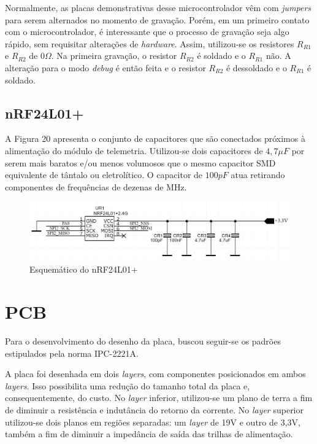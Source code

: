 \documentclass[11pt]{abntex2}
\begin{document}
					Normalmente, as placas demonstrativas desse microcontrolador
					vêm com \textit{jumpers} para serem alternados no momento de
					gravação. Porém, em um primeiro contato com o
					microcontrolador, é interessante que o processo de gravação
					seja algo rápido, sem requisitar alterações de
					\textit{hardware}. Assim, utilizou-se os resistores $R_{R1}$
					e $R_{R2}$ de $0\Omega$. Na primeira gravação, o resistor
					$R_{R2}$ é soldado e o $R_{R1}$ não. A alteração para o modo
					\textit{debug} é então feita e o resistor $R_{R2}$ é
					dessoldado e o $R_{R1}$ é soldado.

				\subsection{nRF24L01+}
					A Figura 20 apresenta o conjunto de capacitores que são
					conectados próximos à alimentação do módulo de telemetria.
					Utilizou-se dois capacitores de $4,7\mu F$ por serem mais
					baratos e/ou menos volumosos que o mesmo capacitor SMD
					equivalente de tântalo ou eletrolítico. O capacitor de
					$100pF$ atua retirando componentes de frequências de dezenas
					de MHz.

					\begin{figure}[!ht]
						\centering
						\includegraphics[width=\linewidth]{../Fotos/nrfEsquematico.jpg}
						\caption{Esquemático do nRF24L01+}
					\end{figure}
			\section{PCB}
				Para o desenvolvimento do desenho da placa, buscou seguir-se
				os padrões estipulados pela norma IPC-2221A.\cite{ipc}

				A placa foi desenhada em dois \textit{layers}, com componentes
				posicionados em ambos \textit{layers}. Isso possibilita uma redução
				do tamanho total da placa e, consequentemente, do custo. No
				\textit{layer} inferior, utilizou-se um plano de terra a fim de
				diminuir a resistência e indutância do retorno da corrente.
				No \textit{layer} superior utilizou-se dois planos em regiões
				separadas: um \textit{layer} de 19V e outro de 3,3V, também a fim de
				diminuir a impedância de saída das trilhas de alimentação.
\end{document}
